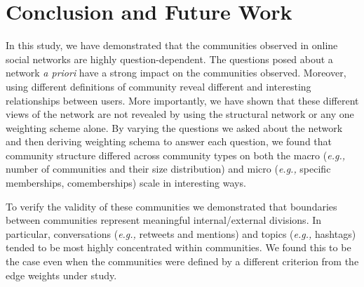 \documentclass[10pt,letterpaper]{article}
\begin{document}
\section{Conclusion and Future Work}

\label{sec:conc}



In this study, we have demonstrated that the communities observed in online social networks are highly question-dependent. The questions posed about a network \emph{a priori} have a strong impact on the communities observed.  Moreover, using different definitions of community reveal different and interesting relationships between users. More importantly, we have shown that these different views of the network are not revealed by using the structural network or any one weighting scheme alone. By varying the questions we asked about the network and then deriving weighting schema to answer each question, we found that community structure differed across community types on both the macro ({\it e.g.,} number of communities and their size distribution) and micro ({\it e.g.,} specific memberships, comemberships) scale in interesting ways.


To verify the validity of these communities we demonstrated that boundaries between communities represent meaningful internal/external divisions. In particular, conversations ({\it e.g.,} retweets and mentions) and topics ({\it e.g.,} hashtags) tended to be most highly concentrated within communities. We found this to be the case even when the communities were defined by a different criterion from the edge weights under study. 
\end{document}
